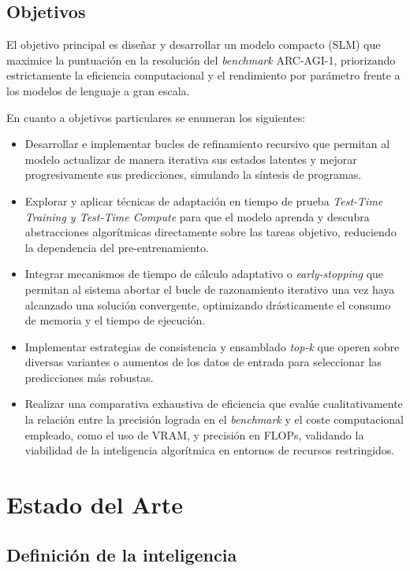 \documentclass[11pt,a4paper,spanish]{book}
\numberwithin{equation}{chapter}
\numberwithin{figure}{chapter}
\begin{document}
\section{Objetivos}

El objetivo principal es diseñar y desarrollar un modelo compacto (SLM) que maximice la puntuación en la resolución del \textit{benchmark} ARC-AGI-1, priorizando estrictamente la
eficiencia computacional y el rendimiento por parámetro frente a los modelos de lenguaje a gran escala.

En cuanto a objetivos particulares se enumeran los siguientes:

\begin{itemize}
	\item Desarrollar e implementar bucles de refinamiento recursivo que permitan al modelo actualizar de manera iterativa sus estados latentes y mejorar progresivamente sus predicciones,
	simulando la síntesis de programas.
	\item Explorar y aplicar técnicas de adaptación en tiempo de prueba \textit{Test-Time Training y Test-Time Compute} para que el modelo aprenda y descubra abstracciones algorítmicas directamente
	sobre las tareas objetivo, reduciendo la dependencia del pre-entrenamiento.
	\item Integrar mecanismos de tiempo de cálculo adaptativo o \textit{early-stopping} que permitan al sistema abortar el bucle de razonamiento iterativo una vez haya 
	alcanzado una solución convergente, optimizando drásticamente el consumo de memoria y el tiempo de ejecución.
	\item Implementar estrategias de consistencia y ensamblado \textit{top-k} que operen sobre diversas variantes o aumentos de los datos de entrada para seleccionar las predicciones más 
	robustas.
	\item Realizar una comparativa exhaustiva de eficiencia que evalúe cualitativamente la relación entre la precisión lograda en el \textit{benchmark} y el coste computacional empleado, como el uso de VRAM,
	y precisión en FLOPs, validando la viabilidad de la inteligencia algorítmica en entornos de recursos restringidos.
\end{itemize}

\chapter{Estado del Arte}

\section{Definición de la inteligencia}
\end{document}
